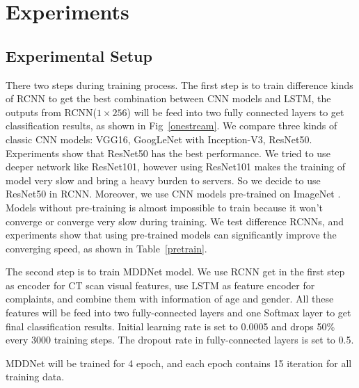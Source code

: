 \section{Experiments}
\label{experiments}

\subsection{Experimental Setup}
\label{experimentalsetup}
There two steps during training process.
The first step is to train difference kinds of RCNN to get the best combination between CNN models and LSTM, the outputs from RCNN($1 \times 256$) will be feed into two fully connected layers to get classification results, as shown in Fig~\ref{onestream}. We compare three kinds of classic CNN models: VGG16, GoogLeNet with Inception-V3, ResNet50. Experiments show that ResNet50 has the best performance. We tried to use deeper network like ResNet101, however using ResNet101 makes the training of model very slow and bring a heavy burden to servers. So we decide to use ResNet50 in RCNN. Moreover, we use CNN models pre-trained on ImageNet \cite{ILSVRC15}. Models without pre-training is almost impossible to train because it won't converge or converge very slow during training. We test difference RCNNs, and experiments show that using pre-trained models can significantly improve the converging speed, as shown in Table~\ref{pretrain}.

The second step is to train MDDNet model. We use RCNN get in the first step as encoder for CT scan visual features, use LSTM as feature encoder for complaints, and combine them with information of age and gender. All these features will be feed into two fully-connected layers and one Softmax layer to get final classification results. Initial learning rate is set to 0.0005 and drops 50\% every 3000 training steps. The dropout rate in fully-connected layers is set to 0.5.

MDDNet will be trained for 4 epoch, and each epoch contains 15 iteration for all training data.


